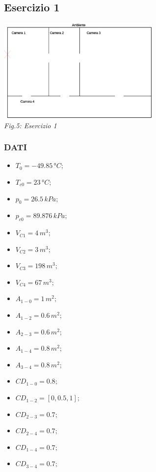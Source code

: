 \documentclass{article}
\begin{document}
        \pagebreak
        \subsection{Esercizio 1}

        \begin{center}
            \includegraphics[width=0.6\textwidth]{ES1_Esercizio1.eps}\\ 
            \textit{Fig.5: Esercizio 1}\\ 
        \end{center}
        \subsubsection{DATI}
        \begin{itemize}
            \item $\displaystyle T_0 = -49.85\,°C;$ \
            \item $\displaystyle T_{c0} = 23\,°C;$ \
            \item $\displaystyle p_0 = 26.5\,kPa;$ \
            \item $\displaystyle p_{c0} = 89.876\,kPa;$ \
            \item $\displaystyle V_{C1} = 4\,m^3;$ \
            \item $\displaystyle V_{C2} = 3\,m^3;$ \
            \item $\displaystyle V_{C3} = 198\,m^3;$ \
            \item $\displaystyle V_{C4} = 67\,m^3;$ \
            \item $\displaystyle A_{1-0} = 1\,m^2;$ \
            \item $\displaystyle A_{1-2} = 0.6\,m^2;$ \
            \item $\displaystyle A_{2-3} = 0.6\,m^2;$ \
            \item $\displaystyle A_{1-4} = 0.8\,m^2;$ \
            \item $\displaystyle A_{3-4} = 0.8\,m^2;$ \
            \item $\displaystyle CD_{1-0} = 0.8;$ \
            \item $\displaystyle CD_{1-2} = [0, 0.5, 1];$ \
            \item $\displaystyle CD_{2-3} = 0.7;$ \
            \item $\displaystyle CD_{2-4} = 0.7;$ \
            \item $\displaystyle CD_{1-4} = 0.7;$ \
            \item $\displaystyle CD_{3-4} = 0.7;$ \
        \end{itemize}
        \pagebreak
\end{document}
